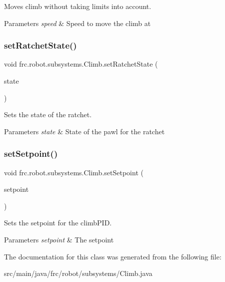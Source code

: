 Moves climb without taking limits into account. 


\begin{DoxyParams}{Parameters}
{\em speed} & Speed to move the climb at \\
\hline
\end{DoxyParams}
\mbox{\label{classfrc_1_1robot_1_1subsystems_1_1_climb_a1870264c5010978b07ac1fdb25e7b08b}} 
\subsubsection{\texorpdfstring{setRatchetState()}{setRatchetState()}}
{\footnotesize\ttfamily void frc.\+robot.\+subsystems.\+Climb.\+set\+Ratchet\+State (\begin{DoxyParamCaption}\item[{\mbox{\hyperlink{enumfrc_1_1robot_1_1enums_1_1_solenoid_state}{Solenoid\+State}}}]{state }\end{DoxyParamCaption})\hspace{0.3cm}{\ttfamily [inline]}}



Sets the state of the ratchet. 


\begin{DoxyParams}{Parameters}
{\em state} & State of the pawl for the ratchet \\
\hline
\end{DoxyParams}
\mbox{\label{classfrc_1_1robot_1_1subsystems_1_1_climb_ae377d7f0bd8e754506b47d62ebac8b6f}} 
\subsubsection{\texorpdfstring{setSetpoint()}{setSetpoint()}}
{\footnotesize\ttfamily void frc.\+robot.\+subsystems.\+Climb.\+set\+Setpoint (\begin{DoxyParamCaption}\item[{double}]{setpoint }\end{DoxyParamCaption})\hspace{0.3cm}{\ttfamily [inline]}}



Sets the setpoint for the climb\+P\+ID. 


\begin{DoxyParams}{Parameters}
{\em setpoint} & The setpoint \\
\hline
\end{DoxyParams}


The documentation for this class was generated from the following file\+:\begin{DoxyCompactItemize}
\item 
src/main/java/frc/robot/subsystems/Climb.\+java\end{DoxyCompactItemize}
